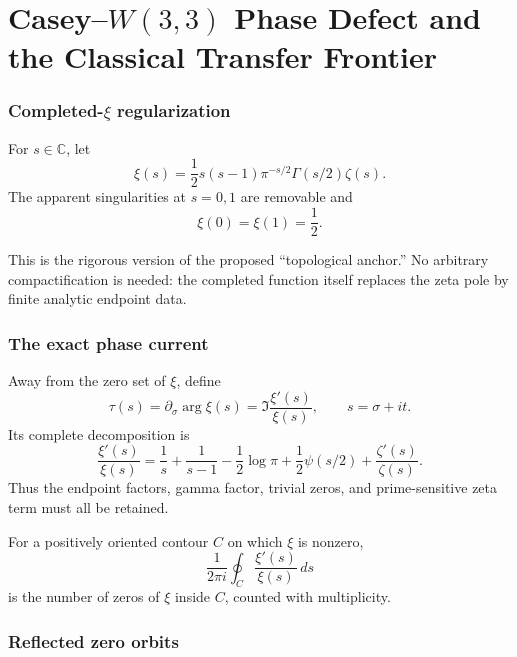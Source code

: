 
\part*{Casey--$W(3,3)$ Phase Defect and the Classical Transfer Frontier}

\section{Completed-$\xi$ regularization}

\begin{definition}
For $s\in\mathbb C$, let
\[
  \xi(s)=\frac12 s(s-1)\pi^{-s/2}\Gamma(s/2)\zeta(s).
\]
The apparent singularities at $s=0,1$ are removable and
\[
  \xi(0)=\xi(1)=\frac12.
\]
\end{definition}

\begin{remark}
This is the rigorous version of the proposed ``topological anchor.''  No
arbitrary compactification is needed: the completed function itself replaces
the zeta pole by finite analytic endpoint data.
\end{remark}

\section{The exact phase current}

Away from the zero set of $\xi$, define
\[
  \tau(s)=\partial_\sigma\arg\xi(s)
  =\Im\frac{\xi'(s)}{\xi(s)},
  \qquad s=\sigma+it.
\]
Its complete decomposition is
\[
  \frac{\xi'(s)}{\xi(s)}
  =\frac1s+\frac1{s-1}-\frac12\log\pi
   +\frac12\psi(s/2)+\frac{\zeta'(s)}{\zeta(s)}.
\]
Thus the endpoint factors, gamma factor, trivial zeros, and prime-sensitive
zeta term must all be retained.

\begin{proposition}
For a positively oriented contour $C$ on which $\xi$ is nonzero,
\[
  \frac{1}{2\pi i}\oint_C\frac{\xi'(s)}{\xi(s)}\,ds
\]
is the number of zeros of $\xi$ inside $C$, counted with multiplicity.
\end{proposition}

\section{Reflected zero orbits}

